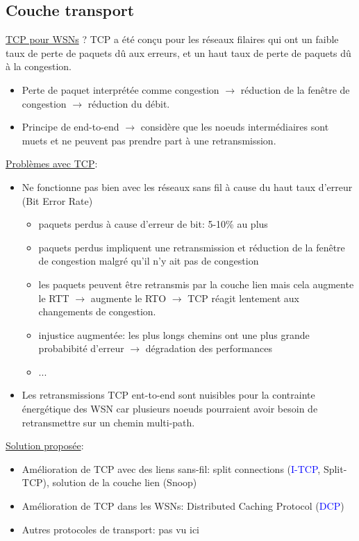 \documentclass{article}
\begin{document}
\begin{sffamily}
\subsection{Couche transport}
\underline{TCP pour WSNs} ?
TCP a été conçu pour les réseaux filaires qui ont un faible taux de perte de
paquets dû aux erreurs, et un haut taux de perte de paquets dû à la congestion.
\begin{itemize}
\item Perte de paquet interprétée comme congestion $\rightarrow$
  réduction de la fenêtre de congestion $\rightarrow$ réduction du débit.
\item Principe de end-to-end $\rightarrow$ considère que les noeuds
  intermédiaires sont muets et ne peuvent pas prendre part à une retransmission.
\end{itemize}

\underline{Problèmes avec TCP}:
\begin{itemize}
\item Ne fonctionne pas bien avec les réseaux sans fil à cause du haut taux
  d'erreur (Bit Error Rate)
  \begin{itemize}
  \item paquets perdus à cause d'erreur de bit: 5-10\% au plus
  \item paquets perdus impliquent une retransmission et réduction de la fenêtre
    de congestion malgré qu'il n'y ait pas de congestion
  \item les paquets peuvent être retransmis par la couche lien mais cela
    augmente le RTT $\rightarrow$ augmente le RTO $\rightarrow$
    TCP réagit lentement aux changements de congestion.
  \item injustice augmentée:
    les plus longs chemins ont une plus grande probabibité d'erreur
    $\rightarrow$ dégradation des performances
  \item ...
  \end{itemize}
\item Les retransmissions TCP ent-to-end sont nuisibles pour la contrainte
énergétique des WSN car plusieurs noeuds pourraient avoir besoin de
retransmettre sur un chemin multi-path.
\end{itemize}

\underline{Solution proposée}:
\begin{itemize}
\item Amélioration de TCP avec des liens sans-fil:
  split connections (\textcolor{blue}{I-TCP}, Split-TCP),
  solution de la couche lien (Snoop)
\item Amélioration de TCP dans les WSNs:
  Distributed Caching Protocol (\textcolor{blue}{DCP})
\item Autres protocoles de transport: pas vu ici
\end{itemize}


\end{sffamily}
\end{document}
